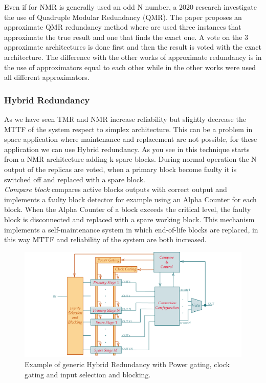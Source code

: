 {{{{		        Even if for NMR is generally used an odd N number, a 2020 research \cite{Highly-Reliable_Approximate_Quadruple_Modular_Redundancy_with_Approximation-Aware_Voting} investigate the use of Quadruple Modular Redundancy (QMR). The paper proposes an approximate QMR redundancy method where are used three instances that approximate the true result and one that finds the exact one. A vote on the 3 approximate architectures is done first and then the result is voted with the exact architecture. The difference with the other works of approximate redundancy is in the use of approximators equal to each other while in the other works were used all different approximators.  
		    }
		    \subsubsection{Hybrid Redundancy}{
		       As we have seen TMR and NMR increase reliability but slightly decrease the MTTF of the system respect to simplex architecture. This can be a problem in space application where maintenance and replacement are not possible, for these application we can use Hybrid redundancy.
		       As you see in  this technique starts from a NMR architecture adding k spare blocks. During normal operation the N output of the replicas are voted, when a primary block become faulty it is switched off and replaced with a spare block. \\
		       
		       \textit{Compare block} compares active blocks outputs with correct output and implements a faulty block detector for example using an Alpha Counter for each block. When the Alpha Counter of a block exceeds the critical level, the faulty block is disconnected and replaced with a spare working block.
		       This mechanism implements a self-maintenance system in which end-of-life blocks are replaced, in this way MTTF and reliability of the system are both increased. \\
		       
        		\begin{figure}[H]
        			\centering
        			\includegraphics[scale=0.2,center]{./images/HybridRedundancy.png}
        			\caption{Example of generic Hybrid Redundancy with Power gating, clock gating and input selection and blocking.}
        			\label{fig:TMRH}
        		\end{figure} 
		       
}}}}
